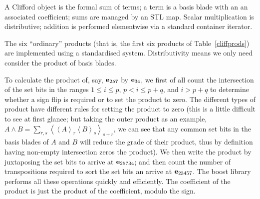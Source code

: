 \documentclass{birkjour}
\theoremstyle{definition}
\theoremstyle{remark}
\numberwithin{equation}{section}
\begin{document}
{\color{blue}

A Clifford object is the formal sum of terms; a term is a basis blade
with an an associated coefficient; sums are managed by an STL map.
Scalar multiplication is distributive; addition is performed
elementwise via a standard container iterator.

The six ``ordinary'' products (that is, the first six products of
Table~\ref{cliffprods}) are implemented using a standardised system.
Distributivity means we only need consider the product of basis
blades.

To calculate the product of, say, ${\bf e}_{257}$ by ${\bf e}_{34}$, we first of
all count the intersection of the set bits in the ranges $1\leqslant
i\leq p$, $p<i\leq p+q$, and $i>p+q$ to determine whether a sign flip
is required or to set the product to zero.  The different types of
product have different rules for setting the product to zero (this is
a little difficult to see at first glance; but taking the outer
product as an example, $\displaystyle A\wedge
B=\sum_{r,s}\left\langle\left\langle A\right\rangle_r\left\langle
B\right\rangle_s\right\rangle_{s+r}$, we can see that any common set
bits in the basis blades of $A$ and $B$ will reduce the grade of their
product, thus by definition having non-empty intersection zeros the
product).  We then write the product by juxtaposing the set bits to
arrive at ${\bf e}_{25734}$; and then count the number of transpositions
required to sort the set bits an arrive at ${\bf e}_{23457}$.  The boost
library performs all these operations quickly and efficiently.  The
coefficient of the product is just the product of the coefficient,
modulo the sign.  }
\end{document}
